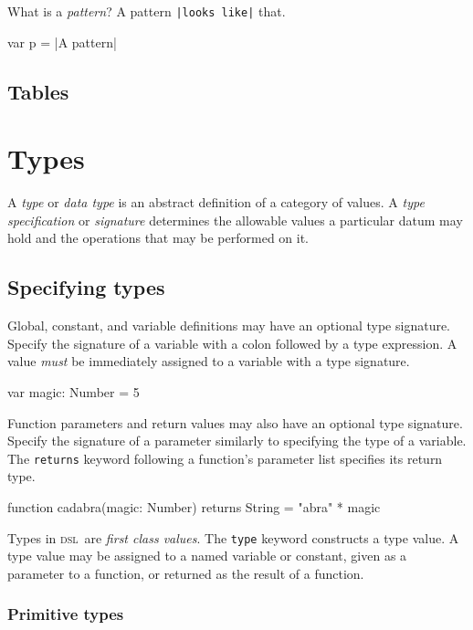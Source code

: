 \documentclass[11pt]{article}
\newcommand{\DSL}{{\scshape dsl}}
\newcommand{\literal}[1]{\lstinline[style=DSL,identifierstyle=\itshape]!#1!}
\newcommand{\keyword}[1]{\literal{#1}}
\begin{document}
What is a \textit{pattern}? A pattern \literal{|looks like|} that.

\begin{dsl}
var p = |A pattern|
\end{dsl}

\subsection{Tables}

\section{Types}

A \textit{type} or \textit{data type} is an abstract definition of a category of values.
A \textit{type specification} or \textit{signature} determines the allowable
values a particular datum may hold and the operations that may be performed on it.

\subsection{Specifying types}

Global, constant, and variable definitions may have an optional type signature.
Specify the signature of a variable with a colon followed by a type expression.
A value \emph{must} be immediately assigned to a variable with a type signature.

\begin{dsl}
var magic: Number = 5
\end{dsl}

Function parameters and return values may also have an optional type signature.
Specify the signature of a parameter similarly to specifying the type of a variable.
The \keyword{returns} keyword following a function's parameter list specifies its return type.

\begin{dsl}
function cadabra(magic: Number) returns String = "abra" * magic
\end{dsl}

Types in \DSL\ are \textit{first class values}.
The \keyword{type} keyword constructs a type value.
A type value may be assigned to a named variable or constant, 
given as a parameter to a function, or returned as the result of a function.

\subsubsection{Primitive types}
\end{document}
